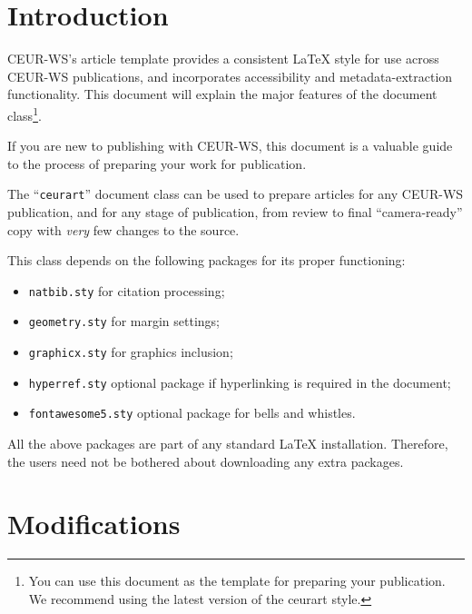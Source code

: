 \documentclass[
twocolumn,
]{ceurart}
\begin{document}
\maketitle

\section{Introduction}

CEUR-WS's article template provides a consistent \LaTeX{} style for
use across CEUR-WS publications, and incorporates accessibility and
metadata-extraction functionality. This document will explain the
major features of the document class\footnote{You can use this
  document as the template for preparing your publication. We
  recommend using the latest version of the ceurart style.}.

If you are new to publishing with CEUR-WS, this document is a valuable
guide to the process of preparing your work for publication.

The ``\verb|ceurart|'' document class can be used to prepare articles
for any CEUR-WS publication, and for any stage of publication, from
review to final ``camera-ready'' copy with {\itshape very} few changes
to the source.

This class depends on the following packages
for its proper functioning:

\begin{itemize}
\item \verb|natbib.sty| for citation processing;
\item \verb|geometry.sty| for margin settings;
\item \verb|graphicx.sty| for graphics inclusion;
\item \verb|hyperref.sty| optional package if hyperlinking is required in
  the document;
\item \verb|fontawesome5.sty| optional package for bells and whistles.
\end{itemize}

All the above packages are part of any
standard \LaTeX{} installation.
Therefore, the users need not be
bothered about downloading any extra packages.

\section{Modifications}
\end{document}
